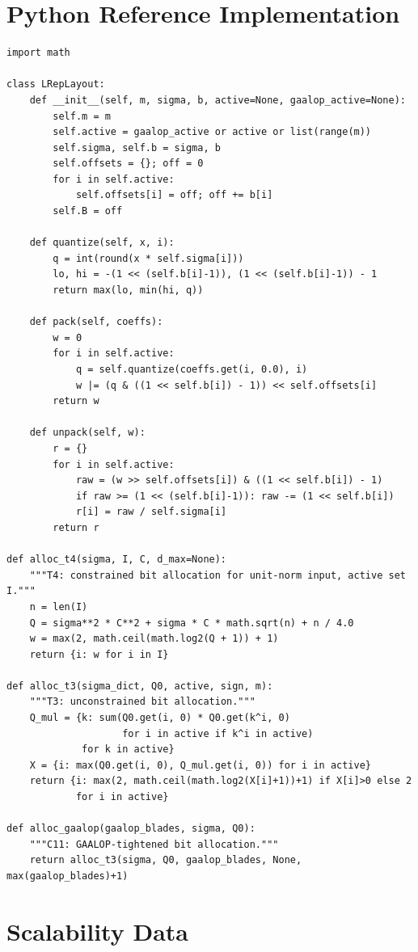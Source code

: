 \documentclass[11pt,a4paper]{article}
\theoremstyle{definition}
\theoremstyle{plain}
\theoremstyle{remark}
\begin{document}
\section{Python Reference Implementation}
\label{app:sim}

\begin{lstlisting}[caption={Complete Python reference model.},
  label=lst:python]
import math

class LRepLayout:
    def __init__(self, m, sigma, b, active=None, gaalop_active=None):
        self.m = m
        self.active = gaalop_active or active or list(range(m))
        self.sigma, self.b = sigma, b
        self.offsets = {}; off = 0
        for i in self.active:
            self.offsets[i] = off; off += b[i]
        self.B = off

    def quantize(self, x, i):
        q = int(round(x * self.sigma[i]))
        lo, hi = -(1 << (self.b[i]-1)), (1 << (self.b[i]-1)) - 1
        return max(lo, min(hi, q))

    def pack(self, coeffs):
        w = 0
        for i in self.active:
            q = self.quantize(coeffs.get(i, 0.0), i)
            w |= (q & ((1 << self.b[i]) - 1)) << self.offsets[i]
        return w

    def unpack(self, w):
        r = {}
        for i in self.active:
            raw = (w >> self.offsets[i]) & ((1 << self.b[i]) - 1)
            if raw >= (1 << (self.b[i]-1)): raw -= (1 << self.b[i])
            r[i] = raw / self.sigma[i]
        return r

def alloc_t4(sigma, I, C, d_max=None):
    """T4: constrained bit allocation for unit-norm input, active set I."""
    n = len(I)
    Q = sigma**2 * C**2 + sigma * C * math.sqrt(n) + n / 4.0
    w = max(2, math.ceil(math.log2(Q + 1)) + 1)
    return {i: w for i in I}

def alloc_t3(sigma_dict, Q0, active, sign, m):
    """T3: unconstrained bit allocation."""
    Q_mul = {k: sum(Q0.get(i, 0) * Q0.get(k^i, 0)
                    for i in active if k^i in active)
             for k in active}
    X = {i: max(Q0.get(i, 0), Q_mul.get(i, 0)) for i in active}
    return {i: max(2, math.ceil(math.log2(X[i]+1))+1) if X[i]>0 else 2
            for i in active}

def alloc_gaalop(gaalop_blades, sigma, Q0):
    """C11: GAALOP-tightened bit allocation."""
    return alloc_t3(sigma, Q0, gaalop_blades, None, max(gaalop_blades)+1)
\end{lstlisting}

\section{Scalability Data}
\label{app:scale}
\end{document}
